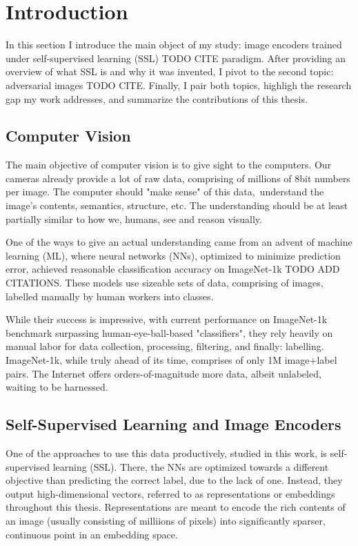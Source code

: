 \chapter{Introduction}\label{chap:introduction}

In this section I introduce the main object of my study: image encoders trained under self-supervised learning (SSL) TODO CITE paradigm. After providing an overview of what SSL is and why it was invented, I pivot to the second topic: adversarial images TODO CITE. Finally, I pair both topics, highligh the research gap my work addresses, and summarize the contributions of this thesis.

\section{Computer Vision}


The main objective of computer vision is to give sight to the computers. Our cameras already provide a lot of raw data, comprising of millions of 8bit numbers per image. The computer should "make sense" of this data,~\ie understand the image's contents, semantics, structure, etc. The understanding should be at least partially similar to how we, humans, see and reason visually. 

One of the ways to give an actual understanding came from an advent of machine learning (ML), where neural networks (NNs), optimized to minimize prediction error, achieved reasonable classification accuracy on ImageNet-1k TODO ADD CITATIONS. These models use sizeable sets of data, comprising of images, labelled manually by human workers into classes.

While their success is impressive, with current performance on ImageNet-1k benchmark surpassing human-eye-ball-based "classifiers", they rely heavily on manual labor for data collection, processing, filtering, and finally: labelling. ImageNet-1k, while truly ahead of its time, comprises of only 1M image+label pairs. The Internet offers orders-of-magnitude more data, albeit unlabeled, waiting to be harnessed.

\section{Self-Supervised Learning and Image Encoders}

One of the approaches to use this data productively, studied in this work, is self-supervised learning (SSL). There, the NNs are optimized towards a different objective than predicting the correct label, due to the lack of one. Instead, they output high-dimensional vectors, referred to as representations or embeddings throughout this thesis. Representations are meant to encode the rich contents of an image (usually consisting of milliions of pixels) into significantly sparser, continuous point in an embedding space. 

